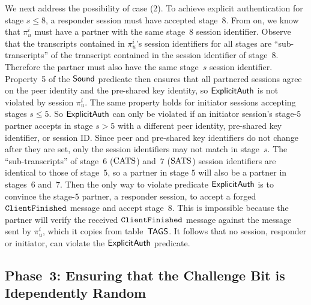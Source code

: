 	We next address the possibility of case (2).
	To achieve explicit authentication for stage $s \leq 8$, a responder session must have accepted stage~$8$.
	From \thisGame on, we know that $\pi_u^i$  must have a partner with the same stage~$8$ session identifier.
	Observe that the transcripts contained in $\pi_u^i$'s session identifiers for all stages are ``sub-transcripts'' of the transcript contained in the session identifier of stage~$8$.
	Therefore the partner must also have the same stage~$s$ session identifier.
	Property~5 of the $ \mathsf{Sound} $ predicate then ensures that all partnered sessions agree on the peer identity and the pre-shared key identity, so $\mathsf{ExplicitAuth}$ is not violated by session $\pi_u^i$.
	The same property holds for initiator sessions accepting stages $s \leq 5$.
	So $\mathsf{ExplicitAuth}$ can only be violated if an initiator session's stage-$5$ partner accepts in stage $s > 5$ with a different peer identity, pre-shared key identifier, or session ID. 
	Since peer and pre-shared key identifiers do not change after they are set, only the session identifiers may not match in stage~$s$.
	The ``sub-transcripts'' of stage~$6$ ($\mathrm{CATS}$) and~$7$ ($\mathrm{SATS}$) session identifiers are identical to those of stage~$5$, so a partner in stage $5$ will also be a partner in stages~$6$ and~$7$.
	Then the only way to violate predicate $\mathsf{ExplicitAuth}$ is to convince the stage-$5$ partner, a responder session, to accept a forged $\mathtt{ClientFinished}$ message and accept stage~$8$.
	This is impossible because the partner will verify the received $\mathtt{ClientFinished}$ message against the message sent by $\pi_u^i$, which it copies from table~$\mathsf{TAGS}$.
	It follows that no session, responder or initiator, can violate the $\mathsf{ExplicitAuth}$ predicate.
	
	\subsection*{Phase~3: Ensuring that the Challenge Bit is Idependently Random}
	
